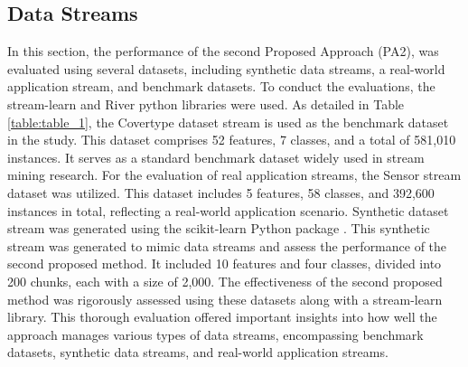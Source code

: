 \subsection{Data Streams}
\label{sec:data_stream}
In this section, the performance of the second Proposed Approach (PA2), was evaluated using several datasets, including synthetic data streams, a real-world application stream, and benchmark datasets. To conduct the evaluations, the stream-learn and River python libraries \cite{ksieniewicz2022stream} were used. As detailed in Table \ref{table:table_1}, the Covertype dataset stream is used as the benchmark dataset in the study. This dataset comprises 52 features, 7 classes, and a total of 581,010 instances. It serves as a standard benchmark dataset widely used in stream mining research. For the evaluation of real application streams, the Sensor stream dataset was utilized. This dataset includes 5 features, 58 classes, and 392,600 instances in total, reflecting a real-world application scenario. Synthetic dataset stream was generated using the scikit-learn Python package \cite{ksieniewicz2022stream}. This synthetic stream was generated to mimic data streams and assess the performance of the second proposed method. It included 10 features and four classes, divided into 200 chunks, each with a size of 2,000. The effectiveness of the second proposed method was rigorously assessed using these datasets along with a stream-learn library. This thorough evaluation offered important insights into how well the approach manages various types of data streams, encompassing benchmark datasets, synthetic data streams, and real-world application streams.

\begin{table}[H]
	\centering
	\caption{The datasets utilized in the experiments exhibited diverse characteristics.}

	\label{table:table_1}
	\end{table}

